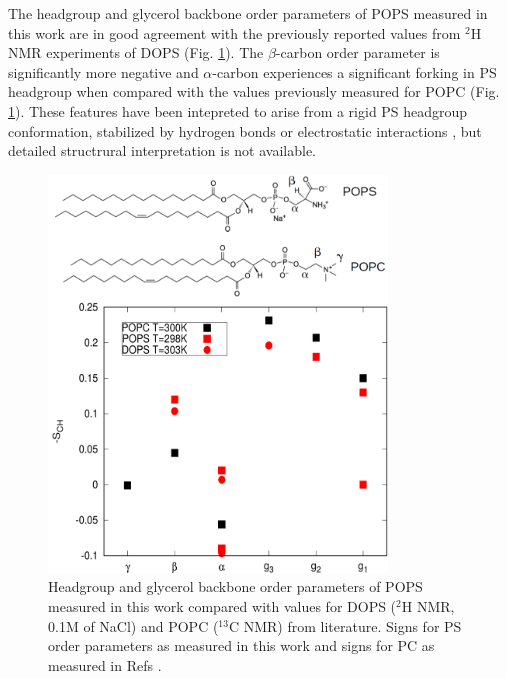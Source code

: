\documentclass[aps,prl,superscriptaddress,twocolumn]{revtex4}
\begin{document}
The headgroup and glycerol backbone order parameters of 
POPS measured in this work are in good agreement with the previously reported
values from $^2$H NMR experiments of DOPS \cite{browning80} (Fig. \ref{HGorderParameters}).
The $\beta$-carbon order parameter is significantly more negative and $\alpha$-carbon
experiences a significant forking in PS headgroup when compared with
the values previously measured for POPC \cite{ferreira13} (Fig. \ref{HGorderParameters}).  
These features have been intepreted to arise from a rigid PS headgroup
conformation, stabilized by hydrogen bonds or electrostatic
interactions \cite{browning80,buldt81}, but detailed structrural interpretation is not
available. 
\begin{figure}[]
  \centering
  \includegraphics[width=9.0cm]{../Figs/PCPScomp.pdf}
  \caption{\label{HGorderParameters}
    Headgroup and glycerol backbone order parameters of POPS measured in this work compared
    with values for DOPS ($^2$H NMR, 0.1M of NaCl) \cite{browning80} and 
    POPC  ($^{13}$C NMR) \cite{ferreira13} from literature. Signs for PS order parameters
    as measured in this work and signs for PC as measured in Refs \cite{??,ferreira16}.
  }
\end{figure}
\end{document}
